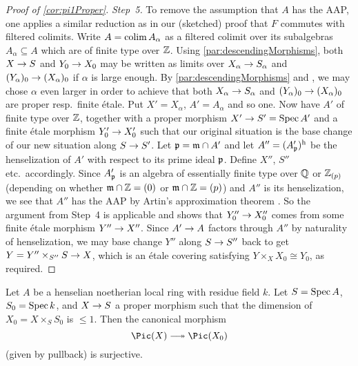 \begin{proof}[Proof of \cref{cor:pi1Proper}]
	 \emph{Step~5.} To remove the assumption that $A$ has the AAP, one applies a similar reduction as in our (sketched) proof that $F$ commutes with filtered colimits. Write $A=\operatorname*{colim} A_\alpha$ as a filtered colimit over its subalgebras $A_\alpha\subseteq A$ which are of finite type over $\mathbb{Z}$. Using \cref{par:descendingMorphisms}, both $X\morphism S$ and $Y_0\morphism X_0$ may be written as limits over $X_\alpha\morphism S_\alpha$ and $(Y_\alpha)_0\morphism (X_\alpha)_0$ if $\alpha$ is large enough. By \cref{par:descendingMorphisms} and , we may chose $\alpha$ even larger in order to achieve that both $X_\alpha\morphism S_\alpha$ and $(Y_\alpha)_0\morphism (X_\alpha)_0$ are proper resp.\ finite étale. Put $X'=X_\alpha$, $A'=A_\alpha$ and so one. Now have $A'$ of finite type over $\mathbb{Z}$, together with a proper morphism $X'\morphism S'=\Spec A'$ and a finite étale morphism $Y_0'\morphism X_0'$ such that our original situation is the base change of our new situation along $S\morphism S'$. Let $\mathfrak{p}=\mathfrak{m}\cap A'$ and let $A''=(A'_{\mathfrak{p}})^{\mathrm{h}}$ be the henselization of $A'$  with respect to its prime ideal $\mathfrak{p}$. Define $X''$, $S''$ etc.\ accordingly. Since $A'_{\mathfrak{p}}$ is an algebra of essentially finite type over $\mathbb{Q}$ or $\mathbb{Z}_{(p)}$ (depending on whether $\mathfrak{m}\cap \mathbb{Z}=(0)$ or $\mathfrak{m}\cap \mathbb{Z}=(p)$) and $A''$ is its henselization, we see that $A''$ has the AAP by Artin's approximation theorem \cite[Theorem~(1.10)]{artinApprox}. So the argument from Step~4 is applicable and shows that $Y_0''\morphism X_0''$ comes from some finite étale morphism $Y''\morphism X''$. Since $A'\morphism A$ factors through $A''$ by naturality of henselization, we may base change $Y''$ along $S\morphism S''$ back to get $Y=Y''\times_{S''}S\morphism X$, which is an étale covering satisfying $Y\times_XX_0\cong Y_0$, as required.
\end{proof}
\begin{cor}\label{cor:PicEpi}
	Let $A$ be a henselian noetherian local ring with residue field $k$. Let $S=\operatorname{Spec} A$, $S_0=\operatorname{Spec} k$, and $X\morphism S$ a proper morphism such that the dimension of $X_0=X\times_SS_0$ is $\leq 1$. Then the canonical morphism
	\begin{equation*}
		\Pic(X)\epimorphism \Pic(X_0)
	\end{equation*}
	(given by pullback) is surjective.
\end{cor}
